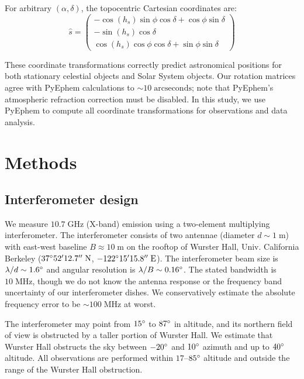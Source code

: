 \documentclass[10pt]{article}
\newcommand {\mt}{\mathrm}
\newcommand {\unit}[1]{\; \mt{#1}}
\begin{document}
For arbitrary $(\alpha, \delta)$, the topocentric Cartesian coordinates are:
\[
	\hat{s} =
	\begin{pmatrix}
		-\cos(h_s) \sin\phi \cos\delta + \cos\phi \sin\delta \\
		-\sin(h_s) \cos\delta \\
		 \cos(h_s) \cos\phi \cos\delta + \sin\phi \sin\delta
	\end{pmatrix}
\]

These coordinate transformations correctly predict astronomical positions for both stationary celestial objects and Solar System objects.
Our rotation matrices agree with PyEphem calculations to $\sim 10 \unit{arcseconds}$; note that PyEphem's atmospheric refraction correction must be disabled.
In this study, we use PyEphem to compute all coordinate transformations for observations and data analysis.


\section{Methods}

\subsection{Interferometer design}

We measure $10.7 \unit{GHz}$ (X-band) emission using a two-element multiplying interferometer.
The interferometer consists of two antennae (diameter $d \sim 1 \unit{m}$) with east-west baseline $B \approx 10 \unit{m}$ on the rooftop of Wurster Hall, Univ. California Berkeley ($37\degree 52' 12.7'' \unit{N}$, $-122\degree 15' 15.8'' \unit{E}$).
The interferometer beam size is $\lambda/d \sim 1.6\degree$ and angular resolution is $\lambda / B \sim 0.16\degree$.
The stated bandwidth is $10 \unit{MHz}$, though we do not know the antenna response or the frequency band uncertainty of our interferometer dishes.
We conservatively estimate the absolute frequency error to be $\sim 100 \unit{MHz}$ at worst.

The interferometer may point from $15\degree$ to $87\degree$ in altitude, and its northern field of view is obstructed by a taller portion of Wurster Hall.
We estimate that Wurster Hall obstructs the sky between $-20\degree$ and $10\degree$ azimuth and up to $40\degree$ altitude.
All observations are performed within $17$--$85\degree$ altitude and outside the range of the Wurster Hall obstruction.
\end{document}
